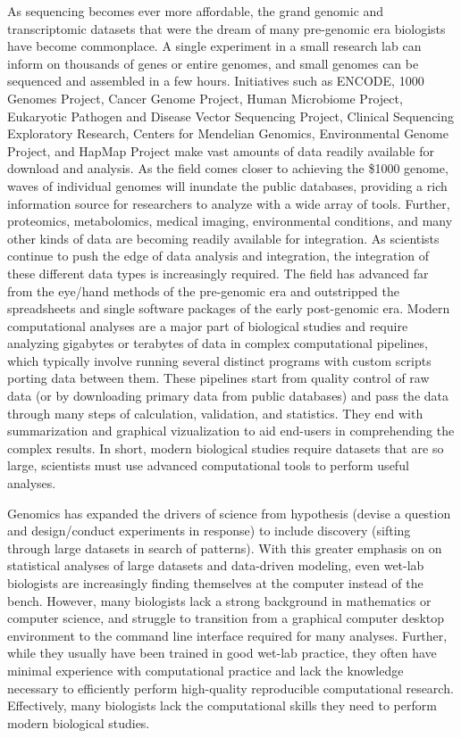 \documentclass[ChapterTOCs,krantz2]{krantz} %
\begin{document}
As sequencing becomes ever more affordable,
the grand genomic and transcriptomic datasets that were the
dream of many pre-genomic era biologists have become commonplace.  A single
experiment in a small research lab can inform on
thousands of genes or entire genomes, and small genomes can be sequenced and assembled in a few hours.
Initiatives such as ENCODE\cite{Encode2004,Myers2011}, 
1000 Genomes Project\cite{Altshuler2010}, 
Cancer Genome Project\cite{Cosmic2011}, Human Microbiome Project\cite{Lewis2012}, 
Eukaryotic Pathogen and Disease Vector Sequencing Project\cite{EPDVSP}, 
Clinical Sequencing Exploratory Research\cite{CSER}, 
Centers for Mendelian Genomics\cite{CMG}, Environmental Genome Project\cite{EGP}, 
and HapMap Project\cite{IHP} make vast amounts of data readily available for
download and analysis.
As the field comes closer to achieving the 
\$1000 genome\cite{Mardis2006}, waves of individual genomes will inundate the 
public databases, providing a rich information source for
researchers to analyze with a wide array of tools.  Further,
proteomics, metabolomics, medical imaging, environmental conditions, and many
other kinds of data are becoming readily available for integration.  As
scientists continue to push the edge of data analysis and integration, the integration of these
different data types is increasingly required.  The field has
advanced far from the eye/hand methods of the pre-genomic era and outstripped
the spreadsheets and single software packages of the early post-genomic era.  
Modern computational analyses are a major part of biological studies \cite{Zhulin2009}
and require analyzing gigabytes or terabytes of data in complex computational
pipelines, which typically involve running several distinct programs with custom
scripts porting data between them.  These pipelines start from quality control of 
raw data (or by downloading primary data from public databases) and pass the data 
through many steps of calculation, validation, and statistics.  They end with
summarization and graphical vizualization to aid end-users in comprehending the
complex results.  In short, modern biological studies require 
datasets that are so large, scientists must use advanced computational tools to 
perform useful analyses.

Genomics has expanded the drivers of science from hypothesis (devise a question 
and design/conduct experiments in response) to include discovery (sifting through large datasets in search of patterns).  With this greater emphasis on 
on statistical analyses of large datasets and data-driven modeling, even wet-lab biologists are
increasingly finding themselves at the computer instead of the bench\cite{Merali2010}.  
However, many biologists lack a strong background in mathematics or
computer science\cite{Bialek2004,Pevzner2009}, 
and struggle to transition from a graphical
computer desktop environment to the command line interface required for
many analyses.  Further, while they
usually have been trained in good wet-lab practice,
they often have minimal experience with computational 
practice and lack the knowledge necessary to 
efficiently perform high-quality reproducible 
computational research\cite{Merali2010,Segal2007}.
Effectively, many biologists lack the computational skills they need to perform 
modern biological studies.
\end{document}
